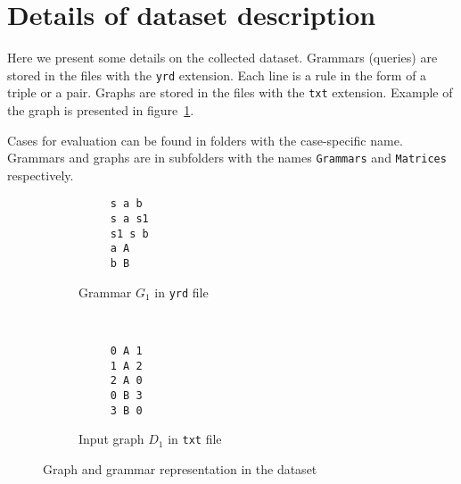 \section{Details of dataset description}

Here we present some details on the collected dataset.
Grammars (queries) are stored in the files with the \verb|yrd| extension.
Each line is a rule in the form of a triple or a pair.
Graphs are stored in the files with the \verb|txt| extension.
Example of the graph is presented in figure~\ref{fig:graph_example}.

Cases for evaluation can be found in folders with the case-specific name.
Grammars and graphs are in subfolders with the names \verb|Grammars| and \verb|Matrices| respectively.

\begin{figure}[h!]
    \centering
    \begin{subfigure}[b]{0.24\textwidth}
        \centering
        \begin{verbatim}
     s a b
     s a s1
     s1 s b
     a A
     b B
        \end{verbatim}
        \caption{Grammar $G_1$ in \texttt{yrd} file}
    \end{subfigure}%
    ~
    \begin{subfigure}[b]{0.20\textwidth}
        \centering
         \begin{verbatim}
     0 A 1
     1 A 2
     2 A 0
     0 B 3
     3 B 0
 \end{verbatim}

        \caption{Input graph $D_1$ in \texttt{txt} file}
    \end{subfigure}
    \caption{Graph and grammar representation in the dataset}
    \label{fig:graph_example}
\end{figure}
